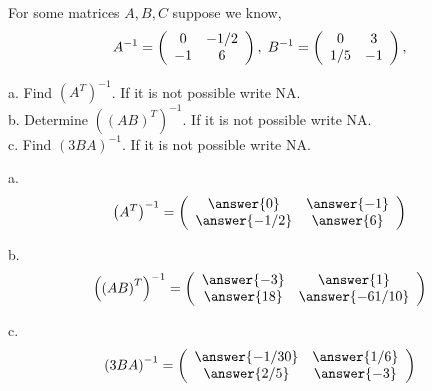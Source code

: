 \documentclass{ximera}
\author{Parisa Fatheddin}
\begin{document}
\begin{exercise}
For some matrices $A, B, C$ suppose we know,
\[ A^{-1} = \left(\begin{array}{ccc}
 0 & -1/2 \\
-1 & 6
\end{array}\right), \hspace{.1cm} B^{-1} =
\left(\begin{array}{ccc}
0 & 3  \\
1/5 & -1
\end{array}\right), \]

a. Find $\left(A^{T}\right)^{-1}$. If it is not possible write NA. \\
b. Determine $\left((AB)^{T}\right)^{-1}$. If it is not possible write NA.\\
c. Find $\left(3BA\right)^{-1}$. If it is not possible write NA.
\begin{prompt}
a. \[ \left(A^{T}\right)^{-1} = \left(\begin{array}{cc}
\answer{0} & \answer{-1}\\
\answer{-1/2} & \answer{6}
\end{array}\right)\]

b. \[ \left(\left(AB\right)^{T}\right)^{-1} = \left(\begin{array}{cc}
\answer{-3} & \answer{1}\\
\answer{18} & \answer{-61/10}
\end{array}\right)
\]

c. \[ \left(3BA\right)^{-1}= \left(\begin{array}{cc}
\answer{-1/30} & \answer{1/6}\\
\answer{2/5} & \answer{-3}
\end{array}\right)
\]





\end{prompt}
\end{exercise}
\end{document}
